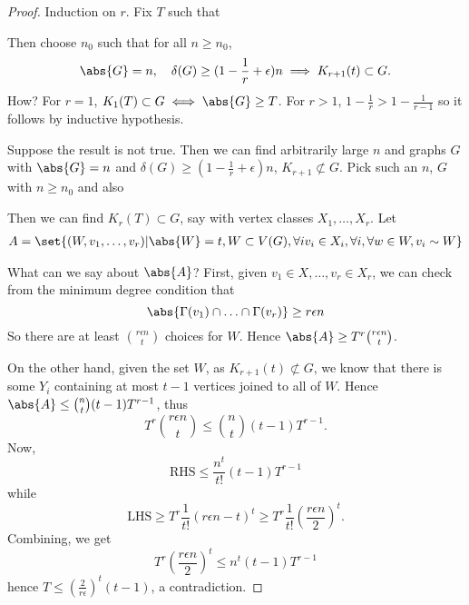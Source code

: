 \documentclass{article}
\begin{document}
\begin{proof}
    Induction on $r$. Fix $T$ such that

    Then choose $n_0$ such that for all $n \geq n_0$,
    \begin{equation}
        \abs{G} = n, \quad \delta(G) \geq (1 - \frac{1}{r} + \epsilon) n \implies K_{r+1}(t) \subset G.
    \end{equation}
    How? For $r=1$, $K_1(T) \subset G \iff \abs{G} \geq T$. For $r > 1$, $1 - \frac{1}{r} > 1 - \frac{1}{r-1}$ so it follows by inductive hypothesis.

    Suppose the result is not true.
    Then we can find arbitrarily large $n$ and graphs $G$ with $\abs{G} = n$ and $\delta(G) \geq (1 - \frac{1}{r} + \epsilon) n$, $K_{r+1} \not\subset G$.
    Pick such an $n$, $G$ with $n \geq n_0$ and also

    Then we can find $K_r(T) \subset G$, say with vertex classes $X_1, \dotsc, X_r$.
    Let
    \begin{align*}
        A = \set{(W, v_1, \dotsc, v_r) | \abs{W} = t, W \subset V(G), \forall i v_i \in X_i, \forall i, \forall w \in W, v_i \sim W}
    \end{align*}

    What can we say about $\abs{A}$?
    First, given $v_1 \in X, \dotsc, v_r \in X_r$, we can check from the minimum degree condition that
    \begin{equation*}
        \abs{\Gamma(v_1) \cap \dotsc \cap \Gamma(v_r)} \geq r \epsilon n
    \end{equation*}
    So there are at least $\binom{r \epsilon n}{t}$ choices for $W$. Hence $\abs{A} \geq T^r \binom{r \epsilon n}{t}$.

    On the other hand, given the set $W$, as $K_{r+1}(t) \not\subset G$, we know that there is some $Y_i$ containing at most $t-1$ vertices joined to all of $W$.
    Hence $\abs{A} \leq \binom{n}{t} (t-1) T^{r-1}$, thus
    \begin{equation*}
        T^r \binom{r \epsilon n}{t} \leq \binom{n}{t} (t-1) T^{r-1}.
    \end{equation*}
    Now,
    \begin{equation*}
        \text{RHS} \leq \frac{n^t}{t!} (t-1) T^{r-1}
    \end{equation*}
    while
    \begin{equation*}
        \text{LHS} \geq T^r \frac{1}{t!} (r \epsilon n - t)^t \geq T^r \frac{1}{t!} (\frac{r \epsilon n}{2})^t.
    \end{equation*}
    Combining, we get
    \begin{equation*}
        T^r (\frac{r \epsilon n}{2})^t \leq n^t (t-1) T^{r-1}
    \end{equation*}
    hence $T \leq (\frac{2}{r \epsilon})^t (t-1)$, a contradiction.
\end{proof}
\end{document}
